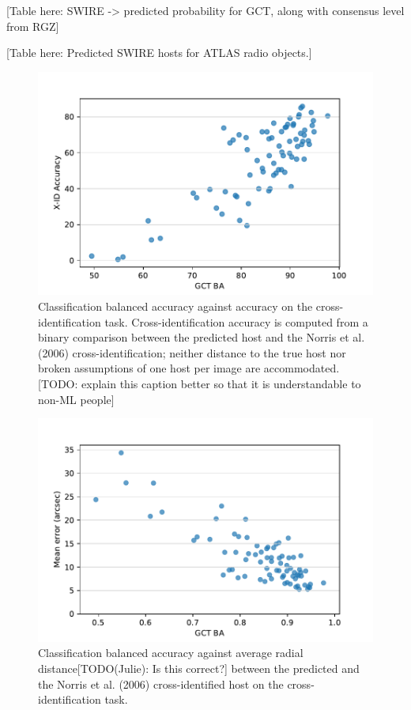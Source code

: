 \documentclass[fleqn,usenatbib,usedcolumn]{mnras}
\begin{document}
  {[}Table here: SWIRE -\textgreater{} predicted probability for GCT,
  along with consensus level from RGZ{]}

  {[}Table here: Predicted SWIRE hosts for ATLAS radio objects.{]}

  \begin{figure}[htbp]
  \centering
  \includegraphics[width=\columnwidth]{gct-to-xid.pdf}
  \caption{Classification balanced accuracy against accuracy on the
  cross-identification task. Cross-identification accuracy is computed
  from a binary comparison between the predicted host and the Norris et
  al. (2006) cross-identification; neither distance to the true host nor
  broken assumptions of one host per image are accommodated. {[}TODO:
  explain this caption better so that it is understandable to non-ML
  people{]}\label{fig:gct-to-xid}}
  \end{figure}

  \begin{figure}[htbp]
  \centering
  \includegraphics[width=\columnwidth]{gct-to-arcsec-error.pdf}
  \caption{Classification balanced accuracy against average radial
  distance{[}TODO(Julie): Is this correct?{]} between the predicted and
  the Norris et al. (2006) cross-identified host on the
  cross-identification task.\label{fig:gct-to-arcsec-error}}
  \end{figure}
\end{document}

